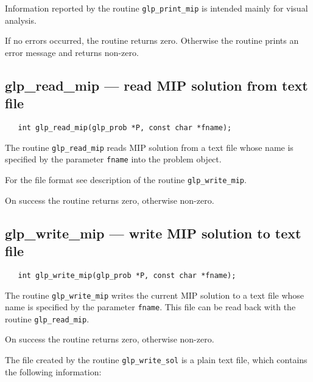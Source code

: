 Information reported by the routine \verb|glp_print_mip| is intended
mainly for visual analysis.

\returns

If no errors occurred, the routine returns zero. Otherwise the routine
prints an error message and returns non-zero.

\subsection{glp\_read\_mip --- read MIP solution from text file}

\synopsis

\begin{verbatim}
   int glp_read_mip(glp_prob *P, const char *fname);
\end{verbatim}

\description

The routine \verb|glp_read_mip| reads MIP solution from a text file
whose name is specified by the parameter \verb|fname| into the problem
object.

For the file format see description of the routine
\verb|glp_write_mip|.

\returns

On success the routine returns zero, otherwise non-zero.

\newpage

\subsection{glp\_write\_mip --- write MIP solution to text file}

\synopsis

\begin{verbatim}
   int glp_write_mip(glp_prob *P, const char *fname);
\end{verbatim}

\description

The routine \verb|glp_write_mip| writes the current MIP solution to
a text file whose name is specified by the parameter \verb|fname|. This
file can be read back with the routine \verb|glp_read_mip|.

\returns

On success the routine returns zero, otherwise non-zero.


The file created by the routine \verb|glp_write_sol| is a plain text
file, which contains the following information:

